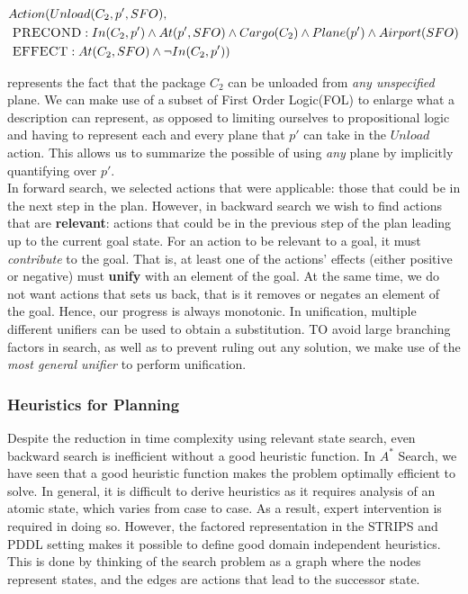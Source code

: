 \documentclass[11pt]{article}
\begin{document}
$$
\begin{aligned}
&Action(Unload(C_2, p', SFO),\\
&\ \textsc{PRECOND}: In(C_2, p') \land At(p', SFO) \land Cargo(C_2) \land Plane(p') \land Airport(SFO)\\
&\ \textsc{EFFECT}: At(C_2, SFO) \land \lnot In(C_2, p'))
\end{aligned}
$$

represents the fact that the package $C_2$ can be unloaded from \textit{any unspecified} plane. We can make use of a subset of First Order Logic(FOL) to enlarge what a description can represent, as opposed to limiting ourselves to propositional logic and having to represent each and every plane that $p'$ can take in the $Unload$ action. This allows us to summarize the possible of using \textit{any} plane by implicitly quantifying over $p'$.\\

In forward search, we selected actions that were applicable: those that could be in the next step in the plan. However, in backward search we wish to find actions that are \textbf{relevant}: actions that could be in the previous step of the plan leading up to the current goal state. For an action to be relevant to a goal, it must \textit{contribute} to the goal. That is, at least one of the actions' effects (either positive or negative) must \textbf{unify} with an element of the goal. At the same time, we do not want actions that sets us back, that is it removes or negates an element of the goal. Hence, our progress is always monotonic. In unification, multiple different unifiers can be used to obtain a substitution. TO avoid large branching factors in search, as well as to prevent ruling out any solution, we make use of the \textit{most general unifier} to perform unification.

\subsubsection{Heuristics for Planning}

Despite the reduction in time complexity using relevant state search, even backward search is inefficient without a good heuristic function. In $A^*$ Search, we have seen that a good heuristic function makes the problem optimally efficient to solve. In general, it is difficult to derive heuristics as it requires analysis of an atomic state, which varies from case to case. As a result, expert intervention is required in doing so. However, the factored representation in the \textsc{STRIPS} and \textsc{PDDL} setting makes it possible to define good domain independent heuristics. This is done by thinking of the search problem as a graph where the nodes represent states, and the edges are actions that lead to the successor state.\\
\end{document}
